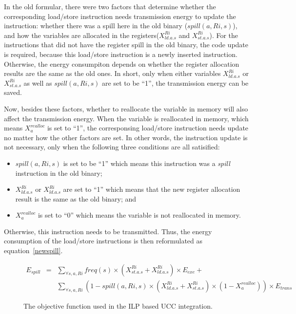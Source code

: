 In the old formular, there were two factors that determine whether the corresponding load/store instruction needs transmission energy
to update the instruction:
whether there was a spill here in the old binary ($spill(a,Ri,s)$), and how the variables are allocated in the registers($X_{ld.a.s}^{Ri}$ and $X_{st.a.s}^{Ri}$).
For the instructions that did not have the register spill in the old binary, the code
update is required, because this load/store instruction is a newly inserted instruction.
Otherwise, the energy consumpiton depends on whether the register allocation results
are the same as the old ones.
In short, only when either variables $X_{ld.a.s}^{Ri}$ or $X_{st.a.s}^{Ri}$ as well as $spill(a,Ri,s)$
are set to be ``1'', the transmission energy can be saved.

Now, besides these factors, whether to reallocate the variable in memory will also
affect the transmission energy.
When the variable is reallocated in memory, which means $X_{a}^{realloc}$
is set to ``1'', the corresponsing load/store instruction needs update
no matter how the other factors are set.
In other words, the instruction update is not necessary, 
only when the following three conditions are all satisified:
\begin{itemize}
	\item $spill(a,Ri,s)$ is set to be ``1'' which means this instruction was a 
{\it spill} instruction in the old binary;
	\item $X_{ld.a.s}^{Ri}$ or $X_{ld.a.s}^{Ri}$ are set to ``1'' which means that the new
register allocation result is the same as the old binary; and
	\item  $X_{a}^{realloc}$
is set to ``0'' which means the variable is not reallocated in memory.
\end{itemize}
Otherwise, this instruction needs to be transmitted.
Thus, the energy consumption of the load/store instructions is then reformulated as equation~\ref{newspill}.

\begin{figure}[ht]
\begin{small}
\begin{eqnarray}
E_{spill} &=& \sum_{\forall s, a, Ri}
freq(s) \times (X_{st.a.s}^{Ri}+X_{ld.a.s}^{Ri}) \times E_{exe} + \nonumber\\
					& & \sum_{\forall s, a, Ri}(1-spill(a,Ri,s)\times
 (X_{ld.a.s}^{Ri}+X_{st.a.s}^{Ri})\times (1-X_{a}^{realloc}))\times E_{trans} \label{newspill} 
\end{eqnarray}
\end{small}
\caption{The objective function used in the ILP based UCC integration.}
\end{figure}

